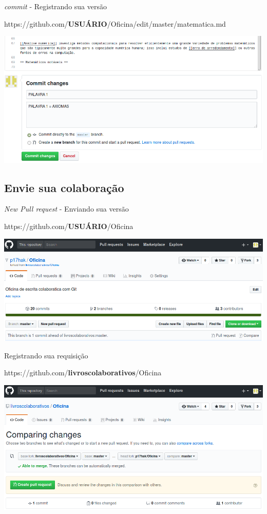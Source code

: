 \documentclass{beamer}
\begin{document}
\begin{frame}{{\it commit} - Registrando sua versão}
  \begin{center}
    https://github.com/{\bf USUÁRIO}/Oficina/edit/master/matematica.md

    \includegraphics[scale=0.3]{./figs/commit_GitHub.png}
  \end{center}
\end{frame}

\subsection{Envie sua colaboração}
\begin{frame}{{\it New Pull request} - Enviando sua versão}
  \begin{center}
    https://github.com/{\bf USUÁRIO}/Oficina

    \includegraphics[scale=0.3]{./figs/New_pull_request_GitHub.png}
  \end{center}
\end{frame}

\begin{frame}{Registrando sua requisição}
  \begin{center}
    https://github.com/{\bf livroscolaborativos}/Oficina

    \includegraphics[scale=0.3]{./figs/Create_pull_request_GitHub.png}
  \end{center}
\end{frame}
\end{document}
